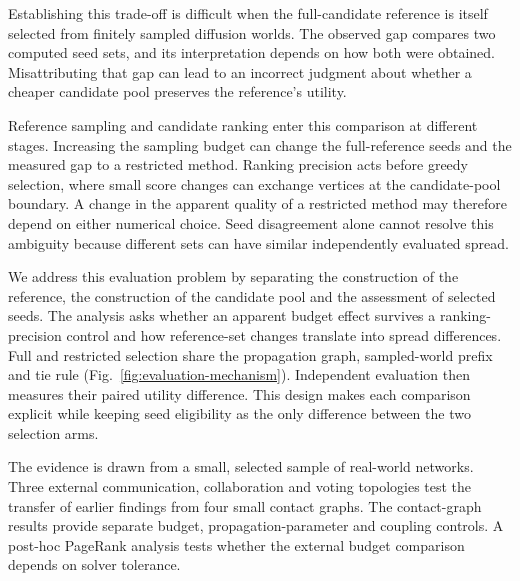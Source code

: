 \documentclass[smallextended]{svjour3}
\begin{document}
Establishing this trade-off is difficult when the full-candidate reference is itself selected from finitely sampled diffusion worlds. The observed gap compares two computed seed sets, and its interpretation depends on how both were obtained. Misattributing that gap can lead to an incorrect judgment about whether a cheaper candidate pool preserves the reference's utility.

Reference sampling and candidate ranking enter this comparison at different stages. Increasing the sampling budget can change the full-reference seeds and the measured gap to a restricted method. Ranking precision acts before greedy selection, where small score changes can exchange vertices at the candidate-pool boundary. A change in the apparent quality of a restricted method may therefore depend on either numerical choice. Seed disagreement alone cannot resolve this ambiguity because different sets can have similar independently evaluated spread.

We address this evaluation problem by separating the construction of the reference, the construction of the candidate pool and the assessment of selected seeds. The analysis asks whether an apparent budget effect survives a ranking-precision control and how reference-set changes translate into spread differences. Full and restricted selection share the propagation graph, sampled-world prefix and tie rule (Fig.~\ref{fig:evaluation-mechanism}). Independent evaluation then measures their paired utility difference. This design makes each comparison explicit while keeping seed eligibility as the only difference between the two selection arms.

The evidence is drawn from a small, selected sample of real-world networks. Three external communication, collaboration and voting topologies test the transfer of earlier findings from four small contact graphs. The contact-graph results provide separate budget, propagation-parameter and coupling controls. A post-hoc PageRank analysis tests whether the external budget comparison depends on solver tolerance.
\end{document}
